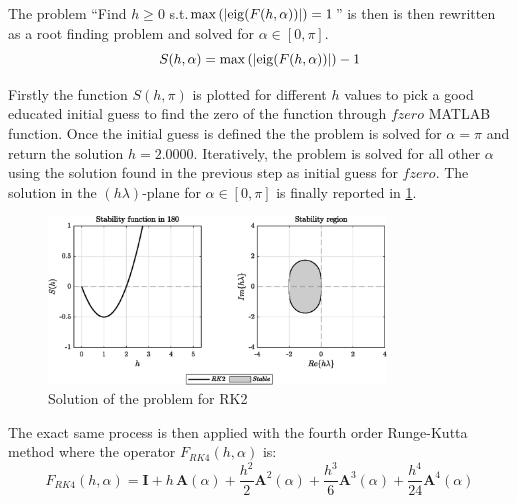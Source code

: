 \documentclass[11pt,a4paper,oneside]{article}
\renewcommand{\vec}[1]{\mathbf{#1}}
\begin{document}
The problem ``Find $h\ge 0$ s.t.$\max\left(|{\rm eig}(F(h,\alpha))|\right) = 1$'' is then is then rewritten as a root finding problem and solved for $\alpha\in[0, \pi]$.
\begin{equation} 
    S(h,\alpha)=\max\left(|{\rm eig}(F(h,\alpha))|\right) - 1
    \label{eq:ex3_problemRK2}
\end{equation}

Firstly the function $S(h,\pi)$ is plotted for different $h$ values to pick a good educated initial guess to find the zero of the function through $fzero$ MATLAB function.
Once the initial guess is defined the the problem is solved for $\alpha = \pi$ and return the solution $h=2.0000$.
Iteratively, the problem is solved for all other $\alpha$ using the solution found in the previous step as initial guess for $fzero$.
The solution in the $(h\lambda)$-plane for $\alpha\in[0, \pi]$ is finally reported in \cref{fig:ex3_stabilityRK2}.
\begin{figure}[htb]
    \centering
    \includegraphics*[width=0.8\textwidth, keepaspectratio]{ex3_rk2.eps}
    \caption[]{\label{fig:ex3_stabilityRK2} Solution of the problem for RK2}
\end{figure}

\clearpage
The exact same process is then applied with the fourth order Runge-Kutta method where the operator $F_{RK4}(h,\alpha)$ is:
\begin{equation} 
    F_{RK4}(h,\alpha) = \vec{I} + h\, \vec{A}(\alpha) + \frac{h^2}{2} \vec{A}^2(\alpha) + \frac{h^3}{6} \vec{A}^3(\alpha) + \frac{h^4}{24} \vec{A}^4(\alpha)
    \label{eq:ex3_operatorRK4}
\end{equation}
\end{document}
